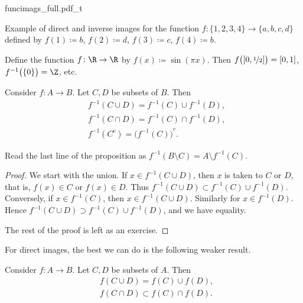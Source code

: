 \begin{myfigureht}
{funcimags_full.pdf_t}
\caption{Example of direct and inverse images for the function
$f \colon \{ 1,2,3,4 \} \to \{ a,b,c,d \}$ defined by
$f(1) \coloneqq b$,
$f(2) \coloneqq d$,
$f(3) \coloneqq c$,
$f(4) \coloneqq b$.\label{figfuncimags}}
\end{myfigureht}

\begin{example}
Define the function $f \colon \R \to \R$ by
$f(x) \coloneqq \sin(\pi x)$.  Then $f\bigl([0,\nicefrac{1}{2}]\bigr) = [0,1]$, 
$f^{-1}\bigl(\{0\}\bigr) = \Z$, etc.
\end{example}

\begin{prop} \label{st:propinv}
Consider $f \colon A \to B$.  Let $C, D$ be subsets of $B$.  Then
\begin{align*}
& f^{-1}( C \cup D) = f^{-1} (C) \cup f^{-1} (D) , \\
& f^{-1}( C \cap D) = f^{-1} (C) \cap f^{-1} (D) , \\
& f^{-1}( C^c) = {\bigl( f^{-1} (C) \bigr)}^c .
\end{align*}
\end{prop}

Read the last line of the proposition as
$f^{-1}( B \setminus C) = A \setminus f^{-1} (C)$.

\begin{proof}
We start with the union.  If $x \in 
f^{-1}( C \cup D)$, then 
$x$ is taken to $C$ or $D$, that is, $f(x) \in C$ or $f(x) \in D$.  Thus
$f^{-1}( C \cup D) \subset f^{-1} (C) \cup f^{-1} (D)$.  Conversely,
if $x \in f^{-1}(C)$, then $x \in f^{-1}(C \cup D)$.  Similarly for
$x \in f^{-1}(D)$.  Hence
$f^{-1}( C \cup D) \supset f^{-1} (C) \cup f^{-1} (D)$, and we have
equality.

The rest of the proof is left as an exercise.
\end{proof}

For direct images, the best we can do is the
following weaker result.

\begin{prop} \label{st:propfor}
Consider $f \colon A \to B$.  Let $C, D$ be subsets of $A$.  Then
\begin{align*}
& f( C \cup D) = f (C) \cup f (D) , \\
& f( C \cap D) \subset f (C) \cap f (D) .
\end{align*}
\end{prop}


